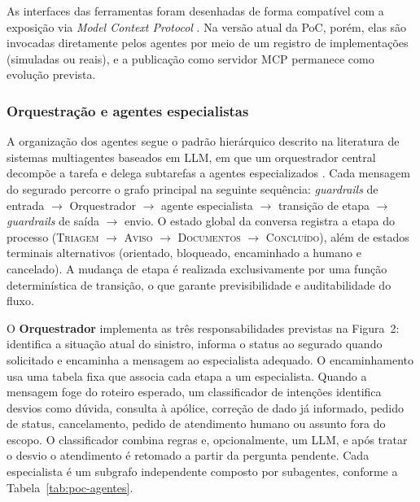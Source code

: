 As interfaces das ferramentas foram desenhadas de forma compatível com a exposição via
\textit{Model Context Protocol} \cite{mcp2025}. Na versão atual da PoC, porém, elas são
invocadas diretamente pelos agentes por meio de um registro de implementações (simuladas ou
reais), e a publicação como servidor MCP permanece como evolução prevista.

\subsubsection{Orquestração e agentes especialistas}

A organização dos agentes segue o padrão hierárquico descrito na literatura de sistemas
multiagentes baseados em LLM, em que um orquestrador central decompõe a tarefa e delega
subtarefas a agentes especializados \cite{hill2025,singhal2026,sapkota2025}. Cada mensagem do
segurado percorre o grafo principal na seguinte sequência:
\textit{guardrails} de entrada $\rightarrow$ Orquestrador $\rightarrow$ agente especialista
$\rightarrow$ transição de etapa $\rightarrow$ \textit{guardrails} de saída $\rightarrow$ envio.
O estado global da conversa registra a etapa do processo
(\textsc{Triagem} $\rightarrow$ \textsc{Aviso} $\rightarrow$ \textsc{Documentos}
$\rightarrow$ \textsc{Concluído}), além de estados terminais alternativos (orientado,
bloqueado, encaminhado a humano e cancelado). A mudança de etapa é realizada exclusivamente
por uma função determinística de transição, o que garante previsibilidade e auditabilidade do
fluxo.

O \textbf{Orquestrador} implementa as três responsabilidades previstas na Figura~2:
identifica a situação atual do sinistro, informa o status ao segurado quando solicitado e
encaminha a mensagem ao especialista adequado. O encaminhamento usa uma tabela fixa que
associa cada etapa a um especialista. Quando a mensagem foge do roteiro esperado, um
classificador de intenções identifica desvios como dúvida, consulta à apólice, correção de
dado já informado, pedido de status, cancelamento, pedido de atendimento humano ou assunto
fora do escopo. O classificador combina regras e, opcionalmente, um LLM, e após tratar o
desvio o atendimento é retomado a partir da pergunta pendente. Cada especialista é um subgrafo
independente composto por subagentes, conforme a Tabela~\ref{tab:poc-agentes}.

